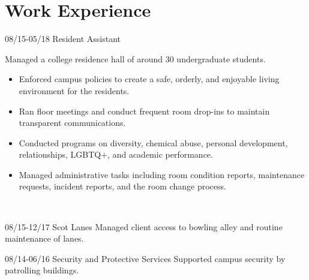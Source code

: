 \documentclass[]{friggeri-cv}
\begin{document}
\section{Work Experience}
\begin{entrylist}
  \entry
    {08/15-05/18}
    {Resident Assistant}
    {}
    {Managed a college residence hall of around 30 undergraduate students.
    \begin{itemize}
        \item Enforced campus policies to create a safe, orderly, and enjoyable living environment for the residents.
        \item Ran floor meetings and conduct frequent room drop-ins to maintain transparent communications.
         \item Conducted programs on diversity, chemical abuse, personal development, relationships, LGBTQ+, and academic performance.
         \item Managed administrative tasks including room condition reports, maintenance requests, incident reports, and the room change process.
    \end{itemize}
     \\}
       \end{entrylist}
\begin{entrylist}

  \entry
    {08/15-12/17}
    {Scot Lanes}
    {}
    {Managed client access to bowling alley and routine maintenance of lanes.\\}
           \end{entrylist}
\begin{entrylist}
    \entry
    {08/14-06/16}
    {Security and Protective Services}
    {}
    {Supported campus security by patrolling buildings.\\}
\end{entrylist}
\end{document}
